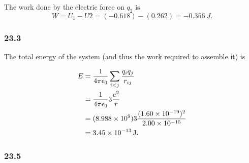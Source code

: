 \documentclass{article}
\begin{document}
The work done by the electric force on $q_2$ is \[W = U_1 - U2 = (\num{-0.618}) - (\num{0.262}) = \qty{-0.356}{J}.\]

\subsubsection{23.3}

The total energy of the system (and thus the work required to assemble it) is

\begin{align*}
  E & = \frac{1}{4 \pi \epsilon_0} \sum_{i < j} \frac{q_i q_j}{r_{ij}}                     \\
    & = \frac{1}{4 \pi \epsilon_0} 3 \frac{e^2}{r}                                         \\
    & = (\num{8.988e9}) 3 \frac{(\num{1.60e-19})^2}{\num{2.00e-15}} \\
    & = \qty{3.45e-13}{J}.
\end{align*}

\subsubsection{23.5}
\end{document}
